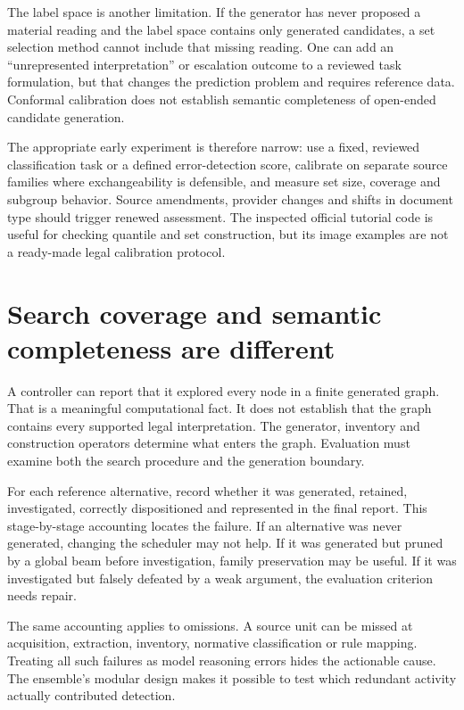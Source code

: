 The label space is another limitation. If the generator has never proposed a
material reading and the label space contains only generated candidates, a set
selection method cannot include that missing reading. One can add an
``unrepresented interpretation'' or escalation outcome to a reviewed task
formulation, but that changes the prediction problem and requires reference data.
Conformal calibration does not establish semantic completeness of open-ended
candidate generation.

The appropriate early experiment is therefore narrow: use a fixed, reviewed
classification task or a defined error-detection score, calibrate on separate
source families where exchangeability is defensible, and measure set size,
coverage and subgroup behavior. Source amendments, provider changes and shifts in
document type should trigger renewed assessment. The inspected official tutorial
code is useful for checking quantile and set construction, but its image examples
are not a ready-made legal calibration protocol.

\section{Search coverage and semantic completeness are different}
\label{merge:M09:10}


A controller can report that it explored every node in a finite generated graph.
That is a meaningful computational fact. It does not establish that the graph
contains every supported legal interpretation. The generator, inventory and
construction operators determine what enters the graph. Evaluation must examine
both the search procedure and the generation boundary.

For each reference alternative, record whether it was generated, retained,
investigated, correctly dispositioned and represented in the final report. This
stage-by-stage accounting locates the failure. If an alternative was never
generated, changing the scheduler may not help. If it was generated but pruned by
a global beam before investigation, family preservation may be useful. If it was
investigated but falsely defeated by a weak argument, the evaluation criterion
needs repair.

The same accounting applies to omissions. A source unit can be missed at
acquisition, extraction, inventory, normative classification or rule mapping.
Treating all such failures as model reasoning errors hides the actionable cause.
The ensemble's modular design makes it possible to test which redundant activity
actually contributed detection.


